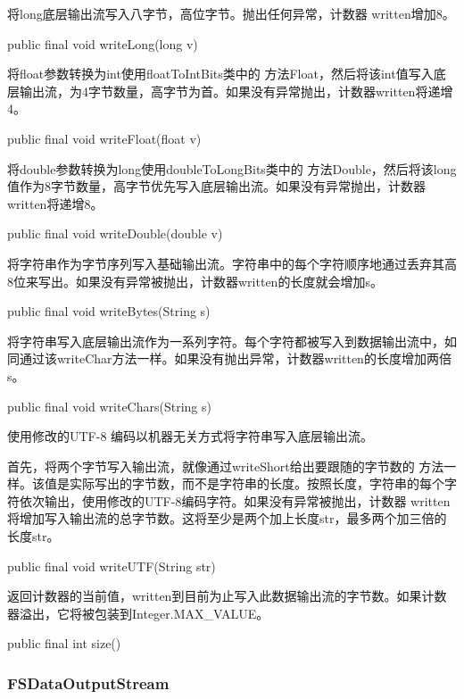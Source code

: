 将long底层输出流写入八字节，高位字节。抛出任何异常，计数器 written增加8。
\begin{java}
public final void writeLong(long v)
\end{java}
将float参数转换为int使用floatToIntBits类中的 方法Float，然后将该int值写入底层输出流，为4字节数量，高字节为首。如果没有异常抛出，计数器written将递增4。

\begin{java}
public final void writeFloat(float v)
\end{java}

将double参数转换为long使用doubleToLongBits类中的 方法Double，然后将该long值作为8字节数量，高字节优先写入底层输出流。如果没有异常抛出，计数器written将递增8。

\begin{java}
public final void writeDouble(double v)
\end{java}

将字符串作为字节序列写入基础输出流。字符串中的每个字符顺序地通过丢弃其高8位来写出。如果没有异常被抛出，计数器written的长度就会增加s。
\begin{java}
public final void writeBytes(String  s)
\end{java}

将字符串写入底层输出流作为一系列字符。每个字符都被写入到数据输出流中，如同通过该writeChar方法一样。如果没有抛出异常，计数器written的长度增加两倍s。
\begin{java}
public final void writeChars(String  s)
\end{java}

使用修改的UTF-8 编码以机器无关方式将字符串写入底层输出流。

首先，将两个字节写入输出流，就像通过writeShort给出要跟随的字节数的 方法一样。该值是实际写出的字节数，而不是字符串的长度。按照长度，字符串的每个字符依次输出，使用修改的UTF-8编码字符。如果没有异常被抛出，计数器 written将增加写入输出流的总字节数。这将至少是两个加上长度str，最多两个加三倍的长度str。


\begin{java}
public final void writeUTF(String str)
\end{java}

返回计数器的当前值，written到目前为止写入此数据输出流的字节数。如果计数器溢出，它将被包装到Integer.MAX\_VALUE。
\begin{java}
public final int size()
\end{java}


\subsubsection{FSDataOutputStream}

